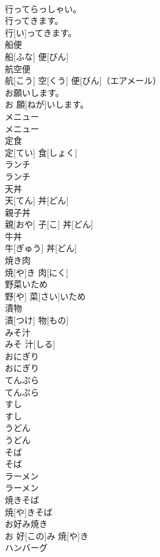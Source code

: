 \documentclass[8pt]{extreport}
\begin{document}
\begin{CJK}{UTF8}{min}
\\	行ってらっしゃい。		
\\	行ってきます。	
\\	行[い]ってきます。		
\\	船便	
\\	船[ふな] 便[びん]		
\\	航空便	
\\	航[こう] 空[くう] 便[びん]（エアメール）		
\\	お願いします。	
\\	お 願[ねが]いします。		
\\	メニュー	
\\	メニュー		
\\	定食	
\\	定[てい] 食[しょく]		
\\	ランチ	
\\	ランチ		
\\	天丼	
\\	天[てん] 丼[どん]		
\\	親子丼	
\\	親[おや] 子[こ] 丼[どん]		
\\	牛丼	
\\	牛[ぎゅう] 丼[どん]		
\\	焼き肉	
\\	焼[や]き 肉[にく]		
\\	野菜いため	
\\	野[や] 菜[さい]いため		
\\	漬物	
\\	漬[つけ] 物[もの]		
\\	みそ汁	
\\	みそ 汁[しる]		
\\	おにぎり	
\\	おにぎり		
\\	てんぷら	
\\	てんぷら		
\\	すし	
\\	すし		
\\	うどん	
\\	うどん		
\\	そば	
\\	そば		
\\	ラーメン	
\\	ラーメン		
\\	焼きそば	
\\	焼[や]きそば		
\\	お好み焼き	
\\	お 好[この]み 焼[や]き		
\\	ハンバーグ	

\end{CJK}
\end{document}
